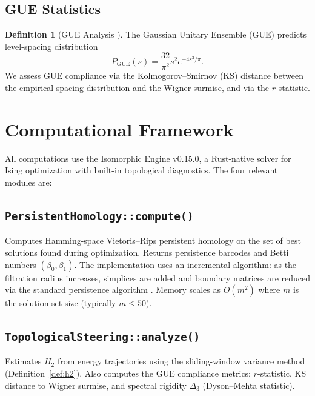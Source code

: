 \documentclass[12pt,a4paper]{article}
\theoremstyle{definition}\newtheorem{definition}[theorem]{Definition}
\theoremstyle{remark}\newtheorem{remark}[theorem]{Remark}
\newcommand{\Htwo}{H_2}
\newcommand{\betaone}{\beta_1}
\newcommand{\betazero}{\beta_0}
\begin{document}
\subsection{GUE Statistics}

\begin{definition}[GUE Analysis \cite{mehta2004}]
\label{def:gue}
The Gaussian Unitary Ensemble (GUE) predicts level-spacing distribution
\begin{equation}
  P_{\mathrm{GUE}}(s) = \frac{32}{\pi^2} s^2 e^{-4s^2/\pi}.
\end{equation}
We assess GUE compliance via the Kolmogorov--Smirnov (KS) distance between
the empirical spacing distribution and the Wigner surmise, and via the
$r$-statistic.
\end{definition}


\section{Computational Framework}
\label{sec:framework}

All computations use the Isomorphic Engine v0.15.0, a Rust-native solver
for Ising optimization with built-in topological diagnostics. The four
relevant modules are:

\subsection{\texttt{PersistentHomology::compute()}}

Computes Hamming-space Vietoris--Rips persistent homology on the set of
best solutions found during optimization. Returns persistence barcodes
and Betti numbers $(\betazero, \betaone)$. The implementation uses an
incremental algorithm: as the filtration radius increases, simplices are
added and boundary matrices are reduced via the standard persistence
algorithm \cite{zomorodian2005}. Memory scales as $O(m^2)$ where $m$ is
the solution-set size (typically $m \leq 50$).

\subsection{\texttt{TopologicalSteering::analyze()}}

Estimates $\Htwo$ from energy trajectories using the sliding-window
variance method (Definition~\ref{def:h2}). Also computes the GUE
compliance metrics: $r$-statistic, KS distance to Wigner surmise, and
spectral rigidity $\Delta_3$ (Dyson--Mehta statistic).
\end{document}
